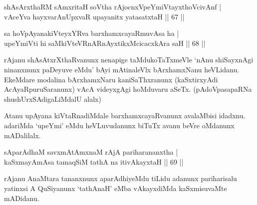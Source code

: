 \begin{shl}
shAsArxthaRM sAmxritaH soV\s tha rAjocnxVpeYmiVtayxthoVcivAnf | \\
\footnotemark[3]vAceYva hayxvarAnUpxvaR upayanitx yatasatxtaH \hfill|| 67 || 
\end{shl}

\begin{shl}
sa hoVpAyanakiVteyxYRva barxhamxcayaRmuvAsa ha | \\
upeYmiVti hi saMkiVteVRnARnAyxtikxMcicacxkAra saH \hfill|| 68 ||  
\end{shl}

\begin{artha}
rAjanu shAsAtxrXthaRvanunx nenapige taMdukoTaTxmeVle `nAnu shiSayxnAgi ninanxnunx paDeyuve eMdu' bAyi mAtinaleVlx bArxhamxNanu heVLidanu. EkeMdare modalina bArxhamxNaru kaniSaThxranunx (kaSxtirxyAdi AcAyaRpuruSaranunx) vAcA videyxgAgi hoMduvaru aSeTx. (pAdoVpasapaRNa shushUrxSAdigaLiMdalU alalx)

Atanu upAyana kiVtaRnadiMdale barxhamxcayaRvanunx avalaMbisi idadxnu. adariMda `upeYmi' eMdu heVLuvudanunx biTuTx avanu beVre oMdanunx mADalilalx.
\end{artha}

\begin{shl}
sAparAdhaM savxmAtAmxnaM rAjA pariharananxtha | \\
kaSxmayAmAsa tamaqSiM tathA na itivAkayxtaH \hfill|| 69 || 
\end{shl}

\begin{artha}
rAjanu AnaMtara tananxnunx aparAdhiyeMdu tiLidu adanunx pariharisalu yatinxsi A QuSiyanunx `tathAnaH' eMba vAkayxdiMda kaSxmisuvaMte mADidanu.
\end{artha}

